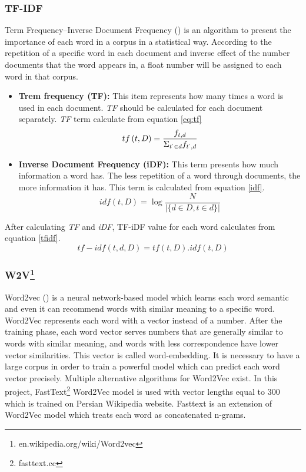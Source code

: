 \subsubsection{TF-IDF}

Term Frequency–Inverse Document Frequency (\cite{tfidf}) is an algorithm to present the importance of each word in a corpus in a statistical way. According to the repetition of a specific word in each document and inverse effect of the number documents that the word appears in, a float number will be assigned to each word in that corpus.  
\begin{itemize}
	\item \textbf{Trem frequency (TF):} This item represents how many times a word is used in each document. \textit{TF} should be calculated for each document separately. \textit{TF} term calculate from equation \ref{eq:tf}
	\begin{equation}
	\label{eq:tf}
		tf \left(t,D\right) = \frac{f_{t,d}}{\Sigma_{t^{`} \in d } f_{t^{`}, d}}
	\end{equation}
	
	\item \textbf{Inverse Document Frequency (iDF):} This term presents how much information a word has. The less repetition of a word through documents, the more information it has. This term is calculated from equation \ref{idf}. 
	\begin{equation}
	\label{idf}
		idf \left( t,D\right) = \log \frac{N}{\left|\{d\in D, t \in d\}\right| }
	\end{equation}
\end{itemize}

\noindent
After calculating \textit{TF} and \textit{iDF}, TF-iDF value for each word calculates from equation \ref{tfidf}.
\begin{equation}
	\label{tfidf}
	tf-idf\left(t,d,D\right) =  tf \left( t,D\right) . idf \left( t,D\right)
\end{equation}


\subsubsection{W2V\protect\footnote{en.wikipedia.org/wiki/Word2vec}}
Word2vec (\cite{word2vec}) is a neural network-based model which learns each word semantic and even it can recommend words with similar meaning to a specific word. Word2Vec represents each word with a vector instead of a number. After the training phase, each word vector serves numbers that are generally similar to words with similar meaning, and words with less correspondence have lower vector similarities. This vector is called word-embedding. It is necessary to have a large corpus in order to train a powerful model which can predict each word vector precisely. Multiple alternative algorithms for Word2Vec exist. In this project, FastText\footnote{fasttext.cc} Word2Vec model is used with vector lengths equal to 300 which is trained on Persian Wikipedia website. Fasttext is an extension of Word2Vec model which treats each word as concatenated n-grams.  


